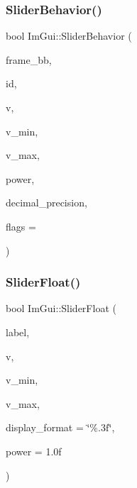 \subsubsection{\texorpdfstring{Slider\+Behavior()}{SliderBehavior()}}
{\footnotesize\ttfamily bool Im\+Gui\+::\+Slider\+Behavior (\begin{DoxyParamCaption}\item[{const \hyperlink{struct_im_rect}{Im\+Rect} \&}]{frame\+\_\+bb,  }\item[{Im\+Gui\+ID}]{id,  }\item[{float $\ast$}]{v,  }\item[{float}]{v\+\_\+min,  }\item[{float}]{v\+\_\+max,  }\item[{float}]{power,  }\item[{int}]{decimal\+\_\+precision,  }\item[{Im\+Gui\+Slider\+Flags}]{flags = {} }\end{DoxyParamCaption})}

\hypertarget{namespace_im_gui_a7c12e66f74025376996b7ac6d1e3a476}{}\label{namespace_im_gui_a7c12e66f74025376996b7ac6d1e3a476} 
\subsubsection{\texorpdfstring{Slider\+Float()}{SliderFloat()}}
{\footnotesize\ttfamily bool Im\+Gui\+::\+Slider\+Float (\begin{DoxyParamCaption}\item[{const char $\ast$}]{label,  }\item[{float $\ast$}]{v,  }\item[{float}]{v\+\_\+min,  }\item[{float}]{v\+\_\+max,  }\item[{const char $\ast$}]{display\+\_\+format = {\ttfamily \char`\"{}\%.3f\char`\"{}},  }\item[{float}]{power = {\ttfamily 1.0f} }\end{DoxyParamCaption})}

\hypertarget{namespace_im_gui_a0d5270d08284202523130e8b6ef66350}{}\label{namespace_im_gui_a0d5270d08284202523130e8b6ef66350} 
